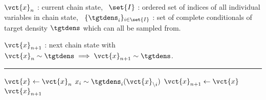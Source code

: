 \begin{algorithmic}
\small
    \Require
    $\vct{x}_n$ : current chain state,~
    $\set{I}$ : ordered set of indices of all individual variables in chain state,~
    $\lbrace \tgtdens_{i} \rbrace_{i\in\set{I}}$ : set of complete conditionals of target density $\tgtdens$ which can all be sampled from.
    \Ensure\raggedright
    $\vct{x}_{n+1}$ : next chain state with $\vct{x}_n \sim \tgtdens \implies \vct{x}_{n+1} \sim \tgtdens$.
\end{algorithmic}
\hrule
\small
\begin{algorithmic}[1]
  \State $\vct{x} \gets \vct{x}_n$
    \State $x_i \sim \tgtdens_{i}(\vct{x}_{\backslash i})$ 
  \EndFor
  \State $\vct{x}_{n+1} \gets \vct{x}$
  \State \Return $\vct{x}_{n+1}$
\end{algorithmic}
